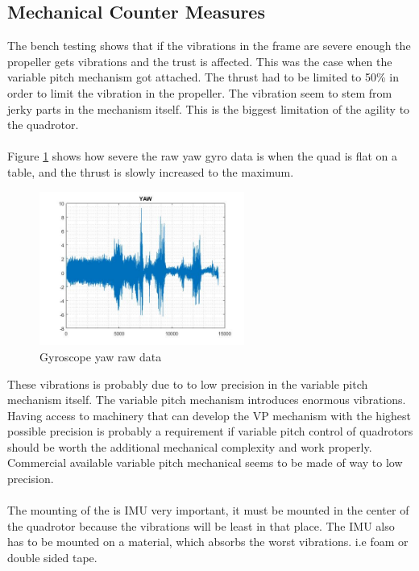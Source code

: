 \subsection{Mechanical Counter Measures}
The bench testing shows that if the vibrations in the frame are severe enough the propeller gets vibrations and the trust is affected. This was the case when the variable pitch mechanism got attached. The thrust had to be limited to 50\% in order to limit the vibration in the propeller. The vibration seem to stem from jerky parts in the mechanism itself. This is the biggest limitation of the agility to the quadrotor.
 \\
 \\
Figure \ref{fig:yo} shows how severe the raw yaw gyro data is when the quad is flat on a table, and the thrust is slowly increased to the maximum.
\begin{figure}[H]
    \centering
         \includegraphics[width = 0.6\textwidth]{NoisePictures/YAWshaftTrow.jpg}
      \caption{Gyroscope yaw raw data}
    \label{fig:yo}
\end{figure} 
These vibrations is probably due to to low precision in the variable pitch mechanism itself. The variable pitch mechanism introduces enormous vibrations. Having access to machinery that can develop the VP mechanism with the highest possible precision is probably a requirement if variable pitch control of quadrotors should be worth the additional mechanical complexity and work properly. Commercial available variable pitch mechanical seems to be made of way to low precision.
\\
\\
The mounting of the is IMU very important, it must be mounted in the center of the quadrotor because the vibrations will be least in that place. The IMU also has to be mounted on a material, which absorbs the worst vibrations. i.e foam or double sided tape.
\\
\\
